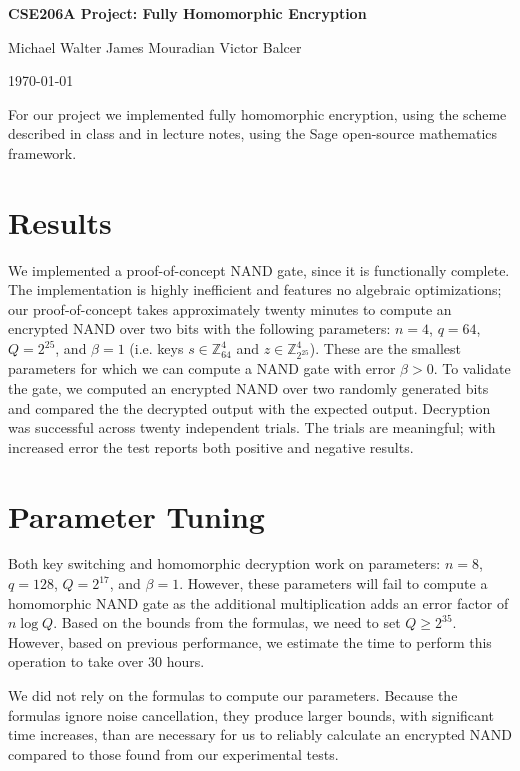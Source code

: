 \documentclass{article}
\begin{document}
\centerline{\LARGE{\bf{CSE206A Project: Fully Homomorphic Encryption}}}
\vspace{12.0pt}
\centerline{Michael Walter \hspace{0.1in} James Mouradian \hspace{0.1in} Victor Balcer}
\vspace{4.0pt}
\centerline{\today}
\vspace{14.0pt}

For our project we implemented fully homomorphic encryption, using the scheme
described in class and in lecture notes, using the Sage open-source mathematics
framework.

\section{Results}

We implemented a proof-of-concept NAND gate, since it is functionally complete.
The implementation is highly inefficient and features no algebraic
optimizations; our proof-of-concept takes approximately twenty minutes to
compute an encrypted NAND over two bits with the following parameters: $n=4$,
$q=64$, $Q=2^{25}$, and $\beta = 1$ (i.e. keys $s\in \mathbb{Z}_{64}^4$ and
$z\in\mathbb{Z}_{2^{25}}^4$). These are the smallest parameters for which we
can compute a NAND gate with error $\beta > 0$. To validate the gate, we
computed an encrypted NAND over two randomly generated bits and compared the
the decrypted output with the expected output. Decryption was successful across
twenty independent trials. The trials are meaningful; with increased error
the test reports both positive and negative results.

\section{Parameter Tuning}

Both key switching and homomorphic decryption work on parameters: $n=8$,
$q=128$, $Q=2^{17}$, and $\beta=1$. However, these parameters will fail to
compute a homomorphic NAND gate as the additional multiplication adds an error
factor of $n\log{Q}$. Based on the bounds from the formulas, we need to set
$Q \ge 2^{35}$. However, based on previous performance, we estimate the time
to perform this operation to take over 30 hours.

We did not rely on the formulas to compute our parameters. Because the formulas
ignore noise cancellation, they produce larger bounds, with significant time increases,
than are necessary for us to reliably calculate an encrypted NAND compared to those
found from our experimental tests.
\end{document}
